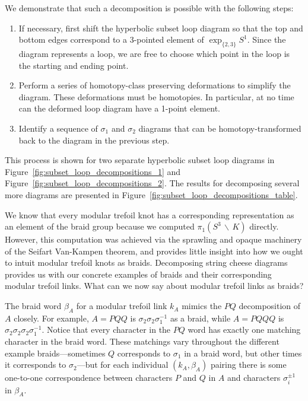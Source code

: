 \documentclass[12pt,twoside]{reedthesis}
\theoremstyle{definition}
\newcommand{\exptwothree}{\exp_{\{2,3\}}}
\newcommand{\wo}{\, \backslash \,}
\begin{document}
We demonstrate that such a decomposition is possible with the following steps:
\begin{enumerate}[1.]
  \item If necessary, first shift the hyperbolic subset loop diagram so that the top and bottom edges correspond to a 3-pointed element of $\exptwothree S^1$.
  Since the diagram represents a loop, we are free to choose which point in the loop is the starting and ending point.

  \item Perform a series of homotopy-class preserving deformations to simplify the diagram.
  These deformations must be homotopies. In particular, at no time can the deformed loop diagram have a 1-point element. 

  \item Identify a sequence of $\sigma_1$ and $\sigma_2$ diagrams that can be homotopy-transformed back to the diagram in the previous step.
\end{enumerate}

This process is shown for two separate hyperbolic subset loop diagrams in Figure~\ref{fig:subset_loop_decompositions_1} and Figure~\ref{fig:subset_loop_decompositions_2}.
The results for decomposing several more diagrams are presented in Figure~\ref{fig:subset_loop_decompositions_table}.

We know that every modular trefoil knot has a corresponding representation as an element of the braid group because we computed $\pi_1(S^3 \wo K)$ directly.
However, this computation was achieved via the sprawling and opaque machinery of the Seifart Van-Kampen theorem, and provides little insight into how we ought to intuit modular trefoil knots as braids.
Decomposing string cheese diagrams provides us with our concrete examples of braids and their corresponding modular trefoil links.
What can we now say about modular trefoil links as braids?

The braid word $\beta_A$ for a modular trefoil link $k_A$ mimics the $PQ$ decomposition of $A$ closely.
For example, $A = PQQ$ is $\sigma_2 \sigma_2 \sigma_1^{-1}$ as a braid, while $A  = PQQQ$ is $\sigma_2 \sigma_2 \sigma_2 \sigma_1^{-1}$.
Notice that every character in the $PQ$ word has exactly one matching character in the braid word.
These matchings vary throughout the different example braids---sometimes $Q$ corresponds to $\sigma_1$ in a braid word, but other times it corresponds to $\sigma_2$---but for each individual $(k_A, \beta_A)$ pairing there is some one-to-one correspondence between characters $P$ and $Q$ in $A$ and characters $\sigma_i^{\pm 1}$ in $\beta_A$.
\end{document}
